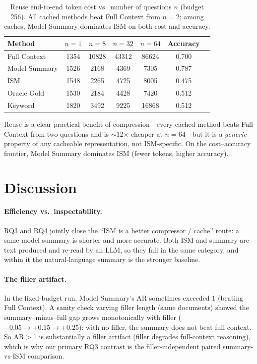\documentclass{article}
\begin{document}
\begin{table}[t]
\centering
\caption{Reuse end-to-end token cost vs.\ number of questions $n$ (budget 256).
All cached methods beat Full Context from $n{=}2$; among caches, Model Summary
dominates ISM on both cost and accuracy.}
\label{tab:reuse}
\begin{tabular}{lcccccc}
\toprule
Method & $n{=}1$ & $n{=}8$ & $n{=}32$ & $n{=}64$ & Accuracy \\
\midrule
Full Context  & 1354 & 10828 & 43312 & 86624 & 0.700 \\
Model Summary & 1526 & 2168  & 4369  & 7305  & 0.787 \\
ISM           & 1548 & 2265  & 4725  & 8005  & 0.475 \\
Oracle Gold   & 1530 & 2184  & 4428  & 7420  & 0.512 \\
Keyword       & 1820 & 3492  & 9225  & 16868 & 0.512 \\
\bottomrule
\end{tabular}
\end{table}

Reuse is a clear practical benefit of compression---every cached method beats Full
Context from two questions and is $\sim$12$\times$ cheaper at $n{=}64$---but it is a
\emph{generic} property of any cacheable representation, not ISM-specific. On the
cost--accuracy frontier, Model Summary dominates ISM (fewer tokens, higher
accuracy).

\section{Discussion}
\label{sec:disc}
\paragraph{Efficiency vs.\ inspectability.}
RQ3 and RQ4 jointly close the ``ISM is a better compressor / cache'' route: a
same-model summary is shorter and more accurate. Both ISM and summary are text
produced and re-read by an LLM, so they fall in the same category, and within it
the natural-language summary is the stronger baseline.

\paragraph{The filler artifact.}
In the fixed-budget run, Model Summary's AR sometimes exceeded $1$ (beating Full
Context). A sanity check varying filler length (same documents) showed the
summary--minus--full gap grows monotonically with filler ($-0.05 \to +0.15 \to
+0.25$): with no filler, the summary does not beat full context. So AR$>$1 is
substantially a filler artifact (filler degrades full-context reasoning), which is
why our primary RQ3 contrast is the filler-independent paired summary-vs-ISM
comparison.
\end{document}
